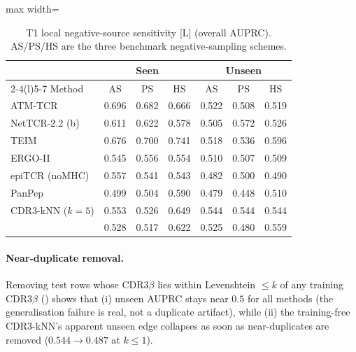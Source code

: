 \begin{table}[h]
\centering
\caption{T1 local negative-source sensitivity [L] (overall AUPRC). AS/PS/HS are
the three benchmark negative-sampling schemes.}
\label{tab:t1-neg}
\small
\setlength{\tabcolsep}{4pt}
\begin{adjustbox}{max width=\textwidth}
\begin{tabular}{@{}lcccccc@{}}
\toprule
 & \multicolumn{3}{c}{Seen} & \multicolumn{3}{c}{Unseen} \\
\cmidrule(r){2-4}\cmidrule(l){5-7}
Method & AS & PS & HS & AS & PS & HS \\
\midrule
ATM-TCR          & 0.696 & 0.682 & 0.666 & 0.522 & 0.508 & 0.519 \\
NetTCR-2.2 (b)   & 0.611 & 0.622 & 0.578 & 0.505 & 0.572 & 0.526 \\
TEIM             & 0.676 & 0.700 & 0.741 & 0.518 & 0.536 & 0.596 \\
ERGO-II          & 0.545 & 0.556 & 0.554 & 0.510 & 0.507 & 0.509 \\
epiTCR (noMHC)   & 0.557 & 0.541 & 0.543 & 0.482 & 0.500 & 0.490 \\
PanPep           & 0.499 & 0.504 & 0.590 & 0.479 & 0.448 & 0.510 \\
CDR3-kNN ($k{=}5$) & 0.553 & 0.526 & 0.649 & 0.544 & 0.544 & 0.544 \\
\midrule
\OursCkpt{}      & 0.528 & 0.517 & 0.622 & 0.525 & 0.480 & 0.559 \\
\bottomrule
\end{tabular}
\end{adjustbox}
\end{table}

\paragraph{Near-duplicate removal.} Removing test rows whose CDR3$\beta$ lies
within Levenshtein $\le k$ of any training CDR3$\beta$ ()
shows that (i) unseen AUPRC stays near $0.5$ for all methods (the generalisation
failure is real, not a duplicate artifact), while (ii) the training-free
CDR3-kNN's apparent unseen edge collapses as soon as near-duplicates are removed
($0.544\!\to\!0.487$ at $k\le1$).


